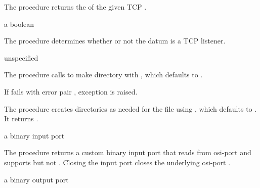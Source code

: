 The  procedure returns the
 of the given TCP .

\begin{procedure}
\end{procedure}
\returns{} a boolean

The  procedure determines whether or not the datum
 is a TCP listener.

\begin{procedure}
\end{procedure}
\returns{} unspecified

The  procedure calls 
to make directory  with , which defaults to
.

If  fails with error pair , exception  is raised.

\begin{procedure}
\end{procedure}
\returns{} 

The  procedure creates directories as needed
for the file  using , which defaults to
. It returns .

\begin{procedure}
\end{procedure}
\returns{} a binary input port

The  procedure returns a custom binary input
port that reads from osi-port  and supports
 but not . Closing the
input port closes the underlying osi-port .

\begin{procedure}
\end{procedure}
\returns{} a binary output port

